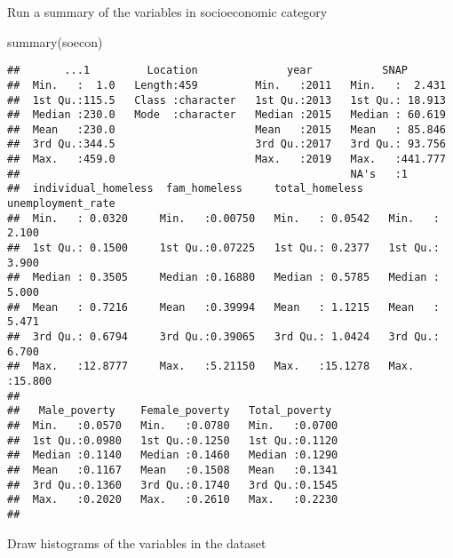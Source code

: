 \documentclass[
]{article}
\newenvironment{Shaded}{\begin{snugshade}}{\end{snugshade}}
\newcommand{\AttributeTok}[1]{\textcolor[rgb]{0.77,0.63,0.00}{#1}}
\newcommand{\FunctionTok}[1]{\textcolor[rgb]{0.00,0.00,0.00}{#1}}
\newcommand{\NormalTok}[1]{#1}
\newcommand{\SpecialCharTok}[1]{\textcolor[rgb]{0.00,0.00,0.00}{#1}}
\newcommand{\StringTok}[1]{\textcolor[rgb]{0.31,0.60,0.02}{#1}}
\begin{document}
Run a summary of the variables in socioeconomic category

\begin{Shaded}
\begin{Highlighting}[]
\FunctionTok{summary}\NormalTok{(soecon)}
\end{Highlighting}
\end{Shaded}

\begin{verbatim}
##       ...1         Location              year           SNAP        
##  Min.   :  1.0   Length:459         Min.   :2011   Min.   :  2.431  
##  1st Qu.:115.5   Class :character   1st Qu.:2013   1st Qu.: 18.913  
##  Median :230.0   Mode  :character   Median :2015   Median : 60.619  
##  Mean   :230.0                      Mean   :2015   Mean   : 85.846  
##  3rd Qu.:344.5                      3rd Qu.:2017   3rd Qu.: 93.756  
##  Max.   :459.0                      Max.   :2019   Max.   :441.777  
##                                                    NA's   :1        
##  individual_homeless  fam_homeless     total_homeless    unemployment_rate
##  Min.   : 0.0320     Min.   :0.00750   Min.   : 0.0542   Min.   : 2.100   
##  1st Qu.: 0.1500     1st Qu.:0.07225   1st Qu.: 0.2377   1st Qu.: 3.900   
##  Median : 0.3505     Median :0.16880   Median : 0.5785   Median : 5.000   
##  Mean   : 0.7216     Mean   :0.39994   Mean   : 1.1215   Mean   : 5.471   
##  3rd Qu.: 0.6794     3rd Qu.:0.39065   3rd Qu.: 1.0424   3rd Qu.: 6.700   
##  Max.   :12.8777     Max.   :5.21150   Max.   :15.1278   Max.   :15.800   
##                                                                           
##   Male_poverty    Female_poverty   Total_poverty   
##  Min.   :0.0570   Min.   :0.0780   Min.   :0.0700  
##  1st Qu.:0.0980   1st Qu.:0.1250   1st Qu.:0.1120  
##  Median :0.1140   Median :0.1460   Median :0.1290  
##  Mean   :0.1167   Mean   :0.1508   Mean   :0.1341  
##  3rd Qu.:0.1360   3rd Qu.:0.1740   3rd Qu.:0.1545  
##  Max.   :0.2020   Max.   :0.2610   Max.   :0.2230  
## 
\end{verbatim}

Draw histograms of the variables in the dataset

\begin{Shaded}
\end{Shaded}
\end{document}

